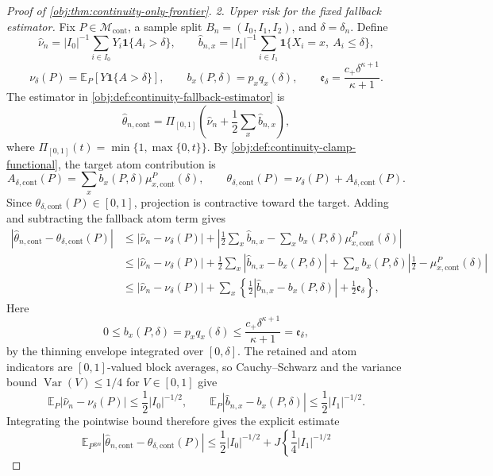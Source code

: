 \documentclass[11pt]{article}
\begin{document}
\begin{proof}[Proof of \cref{obj:thm:continuity-only-frontier}]
\emph{2. Upper risk for the fixed fallback estimator.}
Fix \(P\in\mathcal M_{\mathrm{cont}}\), a sample split \(B_n=(I_0,I_1,I_2)\), and \(\delta=\delta_n\).  Define
\[
\widehat\nu_n
=
|I_0|^{-1}\sum_{i\in I_0}Y_i\mathbf 1\{A_i>\delta\},
\qquad
\widehat b_{n,x}
=
|I_1|^{-1}\sum_{i\in I_1}\mathbf 1\{X_i=x,\ A_i\leq\delta\},
\]
\[
\nu_\delta(P)=\mathbb E_P[Y\mathbf 1\{A>\delta\}],
\qquad
b_x(P,\delta)=p_xq_x(\delta),
\qquad
\mathfrak e_\delta=\frac{c_+\delta^{\kappa+1}}{\kappa+1}.
\]
The estimator in \cref{obj:def:continuity-fallback-estimator} is
\[
\widehat\theta_{n,\mathrm{cont}}
=
\Pi_{[0,1]}\!\left(\widehat\nu_n+\frac12\sum_x\widehat b_{n,x}\right),
\]
where \(\Pi_{[0,1]}(t)=\min\{1,\max\{0,t\}\}\).  By \cref{obj:def:continuity-clamp-functional}, the target atom contribution is
\[
A_{\delta,\mathrm{cont}}(P)
=
\sum_x b_x(P,\delta)\mu_{x,\mathrm{cont}}^P(\delta),
\qquad
\theta_{\delta,\mathrm{cont}}(P)=\nu_\delta(P)+A_{\delta,\mathrm{cont}}(P).
\]
Since \(\theta_{\delta,\mathrm{cont}}(P)\in[0,1]\), projection is contractive toward the target.  Adding and subtracting the fallback atom term gives
\[
\begin{aligned}
\left|\widehat\theta_{n,\mathrm{cont}}-\theta_{\delta,\mathrm{cont}}(P)\right|
&\leq
\left|\widehat\nu_n-\nu_\delta(P)\right|
+\left|\frac12\sum_x\widehat b_{n,x}
      -\sum_x b_x(P,\delta)\mu_{x,\mathrm{cont}}^P(\delta)\right|\\
&\leq
\left|\widehat\nu_n-\nu_\delta(P)\right|
+\frac12\sum_x\left|\widehat b_{n,x}-b_x(P,\delta)\right|
+\sum_x b_x(P,\delta)\left|\frac12-\mu_{x,\mathrm{cont}}^P(\delta)\right|\\
&\leq
\left|\widehat\nu_n-\nu_\delta(P)\right|
+\sum_x\left\{
\frac12\left|\widehat b_{n,x}-b_x(P,\delta)\right|
+\frac12\mathfrak e_\delta
\right\},
\end{aligned}
\]
Here
\[
0\leq b_x(P,\delta)=p_xq_x(\delta)
\leq \frac{c_+\delta^{\kappa+1}}{\kappa+1}
=\mathfrak e_\delta,
\]
by the thinning envelope integrated over \([0,\delta]\).  The retained and atom indicators are
\([0,1]\)-valued block averages, so Cauchy--Schwarz and the variance bound
\(\operatorname{Var}(V)\leq1/4\) for \(V\in[0,1]\) give
\[
\mathbb E_P\left|\widehat\nu_n-\nu_\delta(P)\right|
\leq \frac12 |I_0|^{-1/2},
\qquad
\mathbb E_P\left|\widehat b_{n,x}-b_x(P,\delta)\right|
\leq \frac12 |I_1|^{-1/2}.
\]
Integrating the pointwise bound therefore gives the explicit estimate
\[
\mathbb E_{P^{\otimes n}}
\left|\widehat\theta_{n,\mathrm{cont}}-\theta_{\delta,\mathrm{cont}}(P)\right|
\leq
\frac12 |I_0|^{-1/2}
+J\left\{\frac14 |I_1|^{-1/2}
\]
\end{proof}
\end{document}
